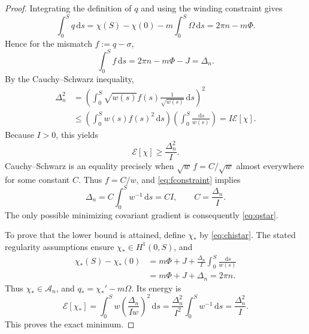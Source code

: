 \documentclass[11pt]{article}
\newcommand{\dd}{\,\mathrm{d}}
\newcommand{\E}{\mathcal{E}}
\begin{document}
\begin{proof}
Integrating the definition of $q$ and using the winding constraint gives
\begin{equation}
  \int_0^S q\dd s
  =\chi(S)-\chi(0)-m\int_0^S\Omega\dd s
  =2\pi n-m\Phi.
  \label{eq:qconstraint}
\end{equation}
Hence for the mismatch $f:=q-\sigma$,
\begin{equation}
  \int_0^S f\dd s=2\pi n-m\Phi-J=\Delta_n.
  \label{eq:fconstraint}
\end{equation}
By the Cauchy--Schwarz inequality,
\begin{align}
  \Delta_n^2
  &=\left(\int_0^S
     \sqrt{w(s)}f(s)\frac{1}{\sqrt{w(s)}}\dd s\right)^2\\
  &\leq\left(\int_0^S w(s)f(s)^2\dd s\right)
          \left(\int_0^S\frac{\dd s}{w(s)}\right)
   =I\E[\chi].
\end{align}
Because $I>0$, this yields
\begin{equation}
  \E[\chi]\geq\frac{\Delta_n^2}{I}.
  \label{eq:lower}
\end{equation}
Cauchy--Schwarz is an equality precisely when
$\sqrt{w}\,f=C/\sqrt{w}$ almost everywhere for some constant $C$.
Thus $f=C/w$, and \eqref{eq:fconstraint} implies
\begin{equation}
  \Delta_n=C\int_0^S w^{-1}\dd s=CI,
  \qquad C=\frac{\Delta_n}{I}.
\end{equation}
The only possible minimizing covariant gradient is consequently
\eqref{eq:qstar}.

To prove that the lower bound is attained, define $\chi_*$ by
\eqref{eq:chistar}.  The stated regularity assumptions ensure
$\chi_*\in H^1(0,S)$, and
\begin{align}
  \chi_*(S)-\chi_*(0)
    &=m\Phi+J+\frac{\Delta_n}{I}
      \int_0^S\frac{\dd s}{w(s)}\\
    &=m\Phi+J+\Delta_n=2\pi n.
\end{align}
Thus $\chi_*\in\mathcal{A}_n$, and $q_*=\chi_*'-m\Omega$.
Its energy is
\begin{equation}
  \E[\chi_*]
  =\int_0^S w\left(\frac{\Delta_n}{Iw}\right)^2\dd s
  =\frac{\Delta_n^2}{I^2}\int_0^S w^{-1}\dd s
  =\frac{\Delta_n^2}{I}.
\end{equation}
This proves the exact minimum.


\end{proof}
\end{document}
